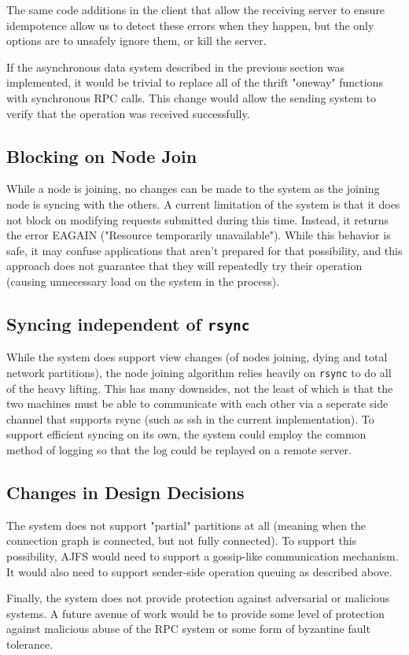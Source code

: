 The same code additions in the client that allow the receiving server to ensure
idempotence allow us to detect these errors when they happen, but the only
options are to unsafely ignore them, or kill the server.

If the asynchronous data system described in the previous section was
implemented, it would be trivial to replace all of the thrift "oneway" functions
with synchronous RPC calls. This change would allow the sending system to verify
that the operation was received successfully.

\subsection{Blocking on Node Join}

While a node is joining, no changes can be made to the system as the joining
node is syncing with the others. A current limitation of the system is that it
does not block on modifying requests submitted during this time. Instead, it
returns the error EAGAIN ("Resource temporarily unavailable"). While this
behavior is safe, it may confuse applications that aren't prepared for that
possibility, and this approach does not guarantee that they will repeatedly try
their operation (causing unnecessary load on the system in the process).

\subsection{Syncing independent of \texttt{rsync}}

While the system does support view changes (of nodes joining, dying and total
network partitions), the node joining algorithm relies heavily on \texttt{rsync}
to do all of the heavy lifting. This has many downsides, not the least of which
is that the two machines must be able to communicate with each other via a
seperate side channel that supports rsync (such as ssh in the current
implementation). To support efficient syncing on its own, the system could
employ the common method of logging so that the log could be replayed on a
remote server.

\subsection{Changes in Design Decisions}

The system does not support "partial" partitions at all (meaning when the
connection graph is connected, but not fully connected). To support this
possibility, AJFS would need to support a gossip-like communication mechanism.
It would also need to support sender-side operation queuing as described above.

Finally, the system does not provide protection against adversarial or malicious
systems. A future avenue of work would be to provide some level of protection
against malicious abuse of the RPC system or some form of byzantine fault
tolerance.

